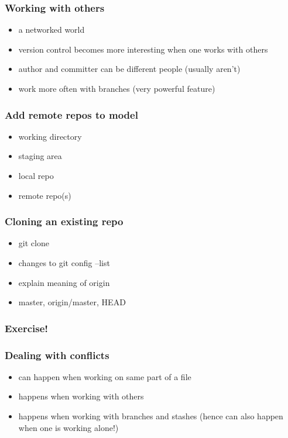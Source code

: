 \documentclass{git_course}
\begin{document}
\begin{frame}
\frametitle{Working with others}
\begin{itemize}
    \item a networked world
    \item version control becomes more interesting when one works with
        others
    \item author and committer can be different people (usually aren't)
    \item work more often with branches (very powerful feature)
\end{itemize}
\end{frame}

\begin{frame}
\frametitle{Add remote repos to model}
\begin{itemize}
    \item working directory
    \item staging area
    \item local repo
    \item remote repo(s)
\end{itemize}
\end{frame}

\begin{frame}
\frametitle{Cloning an existing repo}
\begin{itemize}
    \item git clone
    \item changes to git config --list
    \item explain meaning of origin
    \item master, origin/master, HEAD
\end{itemize}
\end{frame}

\begin{frame}
\frametitle{Exercise!}
\end{frame}

\begin{frame}
\frametitle{Dealing with conflicts}
\begin{itemize}
    \item can happen when working on same part of a file
    \item happens when working with others
    \item happens when working with branches and stashes (hence can also
        happen when one is working alone!)
\end{itemize}
\end{frame}
\end{document}
